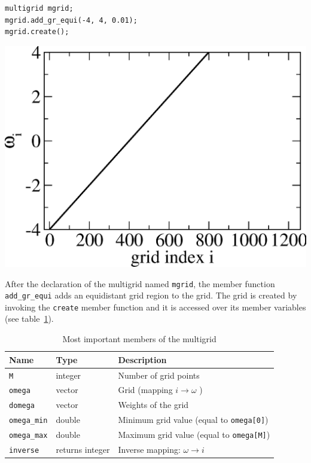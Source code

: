 \vspace{1cm}
\noindent\begin{minipage}[l]{0.6\textwidth}
\begin{lstlisting}
multigrid mgrid;
mgrid.add_gr_equi(-4, 4, 0.01);
mgrid.create();
\end{lstlisting}
\end{minipage}
\begin{minipage}[]{0.4\textwidth}
	\includegraphics[width=1.0\textwidth]{pics/multigrid_00.eps}
\end{minipage}

\vspace{1cm}
After the declaration of the multigrid named \texttt{mgrid}, the member function \texttt{add\_gr\_equi} adds an equidistant grid region to the grid. The grid is created by invoking the \texttt{create} member function and it is accessed over its member variables (see table~\ref{tab:member}). 



\begin{table}[h]
	\begin{center}
		\begin{tabular}{l|l|l}\hline
		Name & Type & Description \\ \hline
		\texttt{M} & integer & Number of grid points\\\hline
		\texttt{omega} & vector & Grid (mapping $i\to\omega$ )\\\hline
		\texttt{domega} & vector & Weights of the grid\\\hline
		\texttt{omega\_min} & double & Minimum grid value (equal to \texttt{omega[0]}) \\\hline
		\texttt{omega\_max} & double & Maximum grid value (equal to \texttt{omega[M]}) \\\hline
		\texttt{inverse} & returns integer & Inverse mapping: $\omega\to i$ \\\hline
		\end{tabular}
	\end{center}
	\caption{Most important members of the multigrid}
	\label{tab:member}
\end{table}

